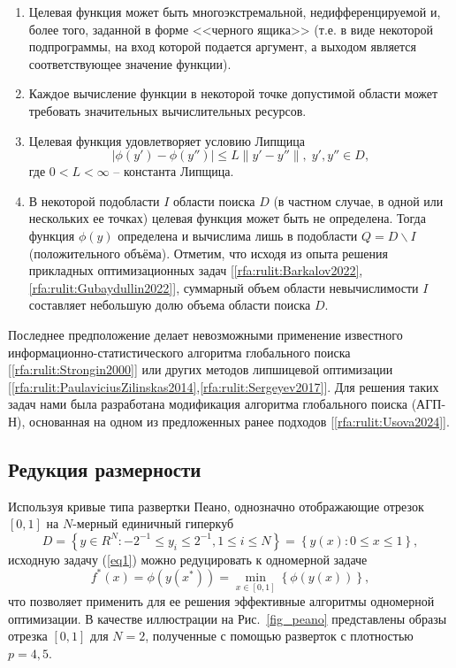 \documentclass[a4paper,12pt,russian]{article}
\begin{document}
\begin{enumerate}
\item{Целевая функция может быть многоэкстремальной, недифференцируемой и, более того, заданной в форме <<черного ящика>> (т.е. в виде некоторой подпрограммы, на вход которой подается аргумент, а выходом является соответствующее значение функции).}
\item{Каждое вычисление функции в некоторой точке допустимой области может требовать значительных вычислительных ресурсов.}
\item{Целевая функция удовлетворяет условию Липщица
\begin{equation}\label{eq3} 
| \phi (y')-\phi (y'') | \leq L \| y'-y'' \|, \; y',y'' \in D,
\end{equation}
где $0<L<\infty$ -- константа Липщица.}
\item{В некоторой подобласти $I$ области поиска $D$ (в частном случае, в одной или нескольких ее точках) целевая функция может быть не определена. Тогда функция $\phi(y)$ определена и вычислима лишь в подобласти $Q = D \backslash I$ (положительного объёма). Отметим, что исходя из опыта решения прикладных оптимизационных задач [\ref{rfa:rulit:Barkalov2022},\ref{rfa:rulit:Gubaydullin2022}], суммарный объем области невычислимости $I$ составляет небольшую долю объема области поиска $D$.}
\end{enumerate}

Последнее предположение делает невозможными применение известного ин\-фор\-ма\-ци\-он\-но-ста\-тис\-ти\-чес\-ко\-го алгоритма глобального поиска [\ref{rfa:rulit:Strongin2000}] или других методов липшицевой оптимизации [\ref{rfa:rulit:PaulaviciusZilinskas2014},\ref{rfa:rulit:Sergeyev2017}]. Для решения таких задач нами была разработана модификация алгоритма глобального поиска (АГП-Н), основанная на одном из предложенных ранее подходов [\ref{rfa:rulit:Usova2024}].

\subsection{Редукция размерности}

Используя кривые типа развертки Пеано, однозначно отображающие отрезок $[0,1]$ на $N$-мерный единичный гиперкуб
\begin{equation}\label{eq2_} 
D=\left\{ y \in R^N: -2^{-1} \leq y_i \leq 2^{-1}, 1 \leq i \leq N \right\} = \left\{ y(x): 0 \leq x \leq 1 \right\},
\end{equation}
исходную задачу (\ref{eq1}) можно редуцировать к одномерной задаче
\begin{equation}\label{eq2} 
f^*(x)=\phi(y(x^* ))=\min_{x \in [0,1]} \left\{ \phi(y(x)) \right\},
\end{equation}
что позволяет применить для ее решения эффективные алгоритмы одномерной оптимизации. В качестве иллюстрации на Рис.~\ref{fig_peano} представлены образы отрезка $[0,1]$ для $N=2$, полученные с помощью разверток с плотностью $p=4,5$.
\end{document}
